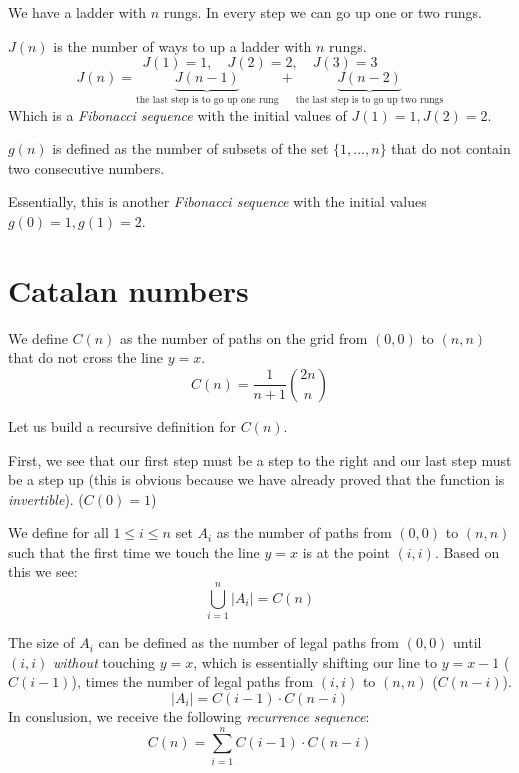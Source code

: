 \documentclass[00_complete]{subfiles}
\begin{document}
\begin{example}
        We have a ladder with $n$ rungs. In every step we can go up one
            or two rungs.

        $J(n)$ is the number of ways to up a ladder with $n$ rungs.
        $$J(1)=1, \quad J(2)=2, \quad J(3)=3$$
        $$
        J(n) =
        \underbrace{J(n-1)}_{\text{the last step is to go up one rung}}+
        \underbrace{J(n-2)}_{\text{the last step is to go up two rungs}}
        $$
        Which is a \emph{Fibonacci sequence} with the initial values of
        $J(1)=1, J(2)=2$.
\end{example}
\begin{example}
    $g(n)$ is defined as the number of subsets of the set $\{1,\dots,n\}$ that do not contain two
    consecutive numbers.

    Essentially, this is another \emph{Fibonacci sequence} with the initial
    values $g(0)=1,g(1)=2$.
\end{example}
\section{Catalan numbers}
\begin{definition}
    We define $C(n)$ as the number of paths on the grid from $(0,0)$ to $(n,n)$
    that do not cross the line $y=x$.
    $$C(n)=\frac{1}{n+1}\binom{2n}{n}$$
\end{definition}
Let us build a recursive definition for $C(n)$.

First, we see that our first step must be a step to the right and our last step
must be a step up (this is obvious because we have already proved that the
function is \emph{invertible}). ($C(0)=1$)

We define for all $1 \leq i \leq n$ set $A_i$ as the number of paths from
$(0,0)$ to $(n,n)$ such that the first time we touch the line $y=x$ is at the
point $(i,i)$. Based on this we see:
$$\bigcup_{i=1}^n|A_i| = C(n)$$

The size of $A_i$ can be defined as the number of legal paths from $(0,0)$ until
$(i,i)$ \emph{without} touching $y=x$, which is essentially shifting our line
to $y=x-1$ ($C(i-1)$), times the number of legal paths from $(i,i)$ to $(n,n)$
($C(n-i)$).
$$|A_i|=C(i-1) \cdot C(n-i)$$
In conslusion, we receive the following \emph{recurrence sequence}:
$$C(n) = \sum_{i=1}^{n}C(i-1)\cdot C(n-i)$$
\end{document}
